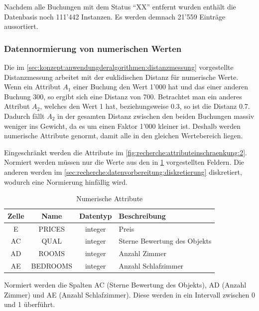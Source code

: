 Nachdem alle Buchungen mit dem Status "`XX"' entfernt wurden enthält die Datenbasis noch 111'442 Instanzen. Es werden demnach 21'559 Einträge aussortiert.%

\subsubsection{Datennormierung von numerischen Werten} 
Die im \label{sec:recherche:datenvorbereitung:normierung} \cref{sec:konzept:anwendungderalgorithmen:distanzmessung} vorgestellte Distanzmessung arbeitet mit der euklidischen Distanz für numerische Werte. Wenn ein Attribut $A_1$ einer Buchung den Wert 1'000 hat und das einer anderen Buchung 300, so ergibt sich eine Distanz von 700. Betrachtet man ein anderes Attribut $A_2$, welches den Wert 1 hat, beziehungsweise 0.3, so ist die Distanz 0.7. Dadurch fällt $A_2$ in der gesamten Distanz zwischen den beiden Buchungen massiv weniger ins Gewicht, da es um einen Faktor 1'000 kleiner ist. Deshalb werden numerische Attribute genormt, damit alle in den gleichen Wertebereich liegen.

Eingeschränkt werden die Attribute im \cref{fig:recherche:attributeinschraenkung:2}. Normiert werden müssen nur die Werte aus den in \cref{fig:recherche:datenvorbereitung:5} vorgestellten Feldern. Die anderen werden im \cref{sec:recherche:datenvorbereitung:diskretierung} diskretiert, wodurch eine Normierung hinfällig wird. 
\begin{table}[H] 
	\caption{Numerische Attribute}
	\centering
	\label{fig:recherche:datenvorbereitung:5}
	\begin{tabular}{ | c | c | c | l | } 
		\hline 
		\rowcolor{tableheadcolor}
		\bfseries Zelle & \bfseries Name & \bfseries Datentyp & \bfseries Beschreibung \\ \hline 
		E & PRICES & integer & Preis \\ \hline 
		AC & QUAL & integer & Sterne Bewertung des Objekts \\ \hline 
		AD & ROOMS & integer & Anzahl Zimmer \\ \hline 
		AE & BEDROOMS & integer & Anzahl Schlafzimmer \\ \hline 
	\end{tabular}
\end{table}

Normiert werden die Spalten AC (Sterne Bewertung des Objekts), AD (Anzahl Zimmer) und AE (Anzahl Schlafzimmer). Diese werden in ein Intervall zwischen 0 und 1 überführt.

